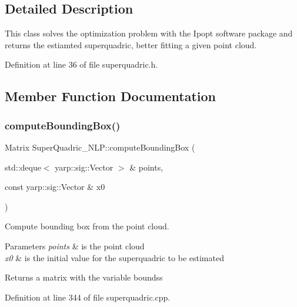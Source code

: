 \subsection{Detailed Description}
This class solves the optimization problem with the Ipopt software package and returns the estiamted superquadric, better fitting a given point cloud. 

Definition at line 36 of file superquadric.\+h.



\subsection{Member Function Documentation}
\mbox{\label{classSuperQuadric__NLP_a425745a725c4f0dba398a6b5389809a7}} 
\subsubsection{\texorpdfstring{compute\+Bounding\+Box()}{computeBoundingBox()}}
{\footnotesize\ttfamily Matrix Super\+Quadric\+\_\+\+N\+L\+P\+::compute\+Bounding\+Box (\begin{DoxyParamCaption}\item[{std\+::deque$<$ yarp\+::sig\+::\+Vector $>$ \&}]{points,  }\item[{const yarp\+::sig\+::\+Vector \&}]{x0 }\end{DoxyParamCaption})\hspace{0.3cm}{\ttfamily [protected]}}



Compute bounding box from the point cloud. 


\begin{DoxyParams}{Parameters}
{\em points} & is the point cloud \\
\hline
{\em x0} & is the initial value for the superquadric to be estimated \\
\hline
\end{DoxyParams}
\begin{DoxyReturn}{Returns}
a matrix with the variable boundss 
\end{DoxyReturn}


Definition at line 344 of file superquadric.\+cpp.


